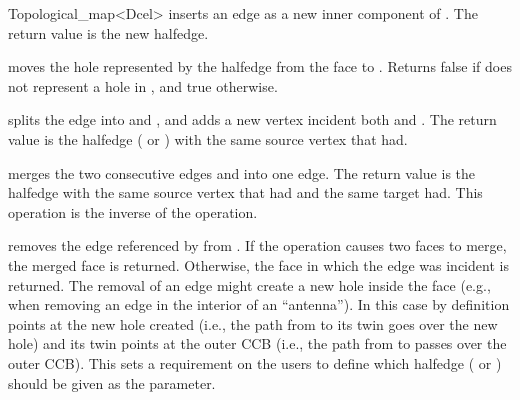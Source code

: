 \begin{ccRefClass}{Topological_map<Dcel>}
     {inserts an edge as a new inner component of
       . The return value is the new halfedge.
       }

     {moves the hole represented by the halfedge  from
        the face  to . Returns false if
         does not represent a hole in ,
        and true otherwise.}


    {splits the edge  into  and   , and
     adds a new vertex incident both  and . 
     The return value
     is the halfedge ( or ) with the same source vertex 
     that  had.
     }

  {merges the two consecutive edges  and  into one 
     edge. The return value is the halfedge with the same source vertex
     that  had and the same target  had.
     This operation is the inverse of the 
     operation.
     }
  
  {removes the edge referenced by  from \ccVar . 
   If the operation causes two faces to merge, the merged face is returned.
   Otherwise, the face in which the edge was incident is returned.
   The removal of an edge might create a new hole inside the face (e.g.,
   when removing an edge in the interior of an ``antenna''). In this
   case by definition  points at the new hole created (i.e., the path
   from  to its twin goes over the new hole) and its twin points
   at the outer CCB (i.e., the path from  to 
   passes over the outer CCB). This sets a requirement on the users to
   define which halfedge ( or ) should be
   given as the parameter.} 

\end{ccRefClass}

\ccRefPageEnd
